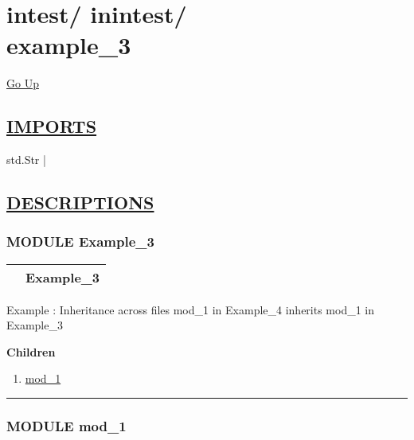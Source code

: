 \chapter*{\color{headfile}
{\large intest\slash\hspace{0pt}}
{\large inintest\slash\hspace{0pt}}
 \\
example_3
}
\hypertarget{ecldoc:toc:intest.inintest.example_3}{}
\hyperlink{ecldoc:toc:root/intest/inintest}{Go Up}

\section*{\underline{\textsf{IMPORTS}}}
\begin{doublespace}
{\large
std.Str |
}
\end{doublespace}

\section*{\underline{\textsf{DESCRIPTIONS}}}
\subsection*{\textsf{\colorbox{headtoc}{\color{white} MODULE}
Example\_3}}

\hypertarget{ecldoc:intest.inintest.Example_3}{}

{\renewcommand{\arraystretch}{1.5}
\begin{tabularx}{\textwidth}{|>{\raggedright\arraybackslash}l|X|}
\hline
\hspace{0pt}\mytexttt{\color{red} } & \textbf{Example\_3} \\
\hline
\end{tabularx}
}

\par
Example : Inheritance across files mod\_1 in Example\_4 inherits mod\_1 in Example\_3


\textbf{Children}
\begin{enumerate}
\item \hyperlink{ecldoc:intest.inintest.Example_3.mod_1}{mod\_1}
\end{enumerate}

\rule{\linewidth}{0.5pt}

\subsection*{\textsf{\colorbox{headtoc}{\color{white} MODULE}
mod\_1}}


